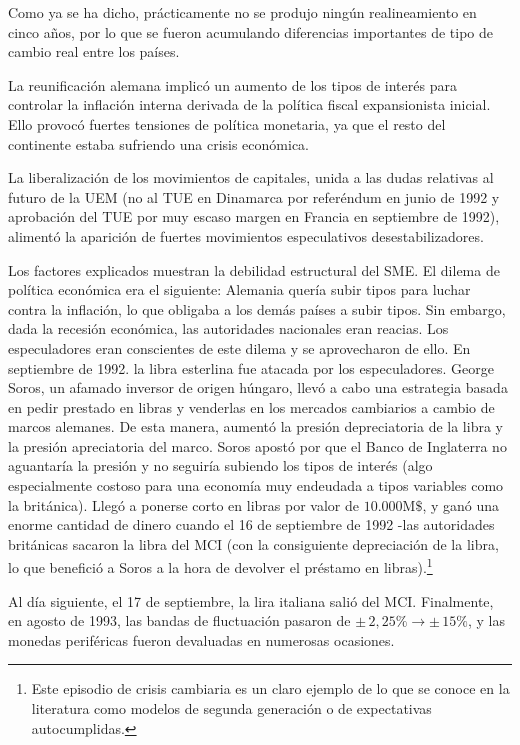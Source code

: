 \documentclass[10pt,a4paper]{article}
\begin{document}
Como ya se ha dicho, prácticamente no se produjo ningún realineamiento en cinco años, por lo que se fueron acumulando diferencias importantes de tipo de cambio real entre los países.

La reunificación alemana implicó un aumento de los tipos de interés para controlar la inflación interna derivada de la política fiscal expansionista inicial. Ello provocó fuertes tensiones de política monetaria, ya que el resto del continente estaba sufriendo una crisis económica. 

La liberalización de los movimientos de capitales, unida a las dudas relativas al futuro de la UEM (no al TUE en Dinamarca por referéndum en junio de 1992 y aprobación del TUE por muy escaso margen en Francia en septiembre de 1992), alimentó la aparición de fuertes movimientos especulativos desestabilizadores.

Los factores explicados muestran la debilidad estructural del SME. El dilema de política económica era el siguiente: Alemania quería subir tipos para luchar contra la inflación, lo que obligaba a los demás países a subir tipos. Sin embargo, dada la recesión económica, las autoridades nacionales eran reacias. Los especuladores eran conscientes de este dilema y se aprovecharon de ello. En septiembre de 1992. la libra esterlina fue atacada por los especuladores. George Soros, un afamado inversor de origen húngaro, llevó a cabo una estrategia basada en pedir prestado en libras y venderlas en los mercados cambiarios a cambio de marcos alemanes. De esta manera, aumentó la presión depreciatoria de la libra y la presión apreciatoria del marco. Soros apostó por que el Banco de Inglaterra no aguantaría la presión y no seguiría subiendo los tipos de interés (algo especialmente costoso para una economía muy endeudada a tipos variables como la británica). Llegó a ponerse corto en libras por valor de $10.000\text{M}\$$, y ganó una enorme cantidad de dinero cuando el 16 de septiembre de 1992 -las autoridades británicas sacaron la libra del MCI (con la consiguiente depreciación de la libra, lo que benefició a Soros a la hora de devolver el préstamo en libras).\footnote{%
    Este episodio de crisis cambiaria es un claro ejemplo de lo que se conoce en la literatura como modelos de segunda generación o de expectativas autocumplidas.
} 

Al día siguiente, el 17 de septiembre, la lira italiana salió del MCI. Finalmente, en agosto de 1993, las bandas de fluctuación pasaron de $\pm\,2,25\%\to\pm\,15\%$, y las monedas periféricas fueron devaluadas en numerosas ocasiones. 
\end{document}
